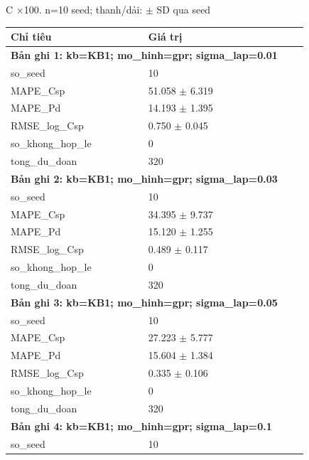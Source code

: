\par\smallskip\noindent C ×100. n=10 seed; thanh/dải: $\pm$ SD qua seed\par
\begin{longtable}{p{0.43\linewidth}p{0.50\linewidth}}
\toprule Chỉ tiêu & Giá trị \\ \midrule \endhead
\multicolumn{2}{p{0.95\linewidth}}{\textbf{Bản ghi 1: kb=KB1; mo\_hinh=gpr; sigma\_lap=0.01}} \\
so\_\allowbreak seed & 10 \\
MAPE\_\allowbreak Csp & 51.058 $\pm$ 6.319 \\
MAPE\_\allowbreak Pd & 14.193 $\pm$ 1.395 \\
RMSE\_\allowbreak log\_\allowbreak Csp & 0.750 $\pm$ 0.045 \\
so\_\allowbreak khong\_\allowbreak hop\_\allowbreak le & 0 \\
tong\_\allowbreak du\_\allowbreak doan & 320 \\
\midrule
\multicolumn{2}{p{0.95\linewidth}}{\textbf{Bản ghi 2: kb=KB1; mo\_hinh=gpr; sigma\_lap=0.03}} \\
so\_\allowbreak seed & 10 \\
MAPE\_\allowbreak Csp & 34.395 $\pm$ 9.737 \\
MAPE\_\allowbreak Pd & 15.120 $\pm$ 1.255 \\
RMSE\_\allowbreak log\_\allowbreak Csp & 0.489 $\pm$ 0.117 \\
so\_\allowbreak khong\_\allowbreak hop\_\allowbreak le & 0 \\
tong\_\allowbreak du\_\allowbreak doan & 320 \\
\midrule
\multicolumn{2}{p{0.95\linewidth}}{\textbf{Bản ghi 3: kb=KB1; mo\_hinh=gpr; sigma\_lap=0.05}} \\
so\_\allowbreak seed & 10 \\
MAPE\_\allowbreak Csp & 27.223 $\pm$ 5.777 \\
MAPE\_\allowbreak Pd & 15.604 $\pm$ 1.384 \\
RMSE\_\allowbreak log\_\allowbreak Csp & 0.335 $\pm$ 0.106 \\
so\_\allowbreak khong\_\allowbreak hop\_\allowbreak le & 0 \\
tong\_\allowbreak du\_\allowbreak doan & 320 \\
\midrule
\multicolumn{2}{p{0.95\linewidth}}{\textbf{Bản ghi 4: kb=KB1; mo\_hinh=gpr; sigma\_lap=0.1}} \\
so\_\allowbreak seed & 10 \\

\end{longtable}
